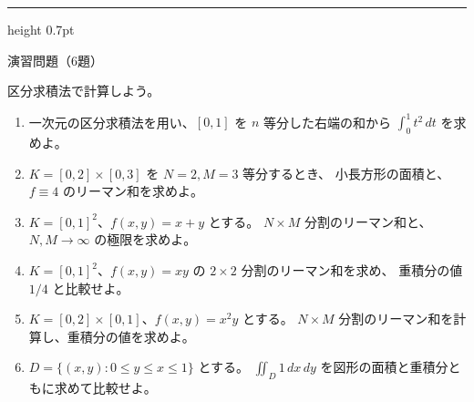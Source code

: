 \documentclass[a4paper,10pt,pdflatex,ja=standard,jafont=ipaex-type1,
  magstyle=real,scale=1]{bxjsarticle}
\newcommand{\topic}[1]{\par\vspace{5pt}%
  {\large\sffamily\mdseries\color{accent}#1}\par\vspace{2pt}}
\newenvironment{problems}
  {\begin{enumerate}[leftmargin=2em,itemsep=3pt,topsep=3pt,parsep=0pt,
    font=\color{accent}]}
  {\end{enumerate}}
\newcommand{\problemspace}{\par\vspace{9mm}}
\newcommand{\exercises}{%
  {\color{accent}\hrule height 0.7pt}\vspace{3pt}%
  \topic{演習問題（6題）}%
  {\small 区分求積法で計算しよう。}\par}
\begin{document}
\noindent\begin{minipage}[b][0.5\textheight][t]{\linewidth}
\exercises
\begin{problems}
\item 一次元の区分求積法を用い、$[0,1]$ を $n$ 等分した右端の和から
$\displaystyle\int_0^1 t^2\,dt$ を求めよ。\problemspace

\item $K=[0,2]\times[0,3]$ を $N=2,M=3$ 等分するとき、
小長方形の面積と、$f\equiv4$ のリーマン和を求めよ。\problemspace

\item $K=[0,1]^2$、$f(x,y)=x+y$ とする。
$N\times M$ 分割のリーマン和と、$N,M\to\infty$ の極限を求めよ。\problemspace

\item $K=[0,1]^2$、$f(x,y)=xy$ の $2\times2$ 分割のリーマン和を求め、
重積分の値 $1/4$ と比較せよ。\problemspace

\item $K=[0,2]\times[0,1]$、$f(x,y)=x^2y$ とする。
$N\times M$ 分割のリーマン和を計算し、重積分の値を求めよ。\problemspace


\item $D=\{(x,y):0\le y\le x\le1\}$ とする。
$\iint_D1\,dx\,dy$ を図形の面積と重積分ともに求めて比較せよ。\problemspace

\end{problems}
\end{minipage}
\end{document}
